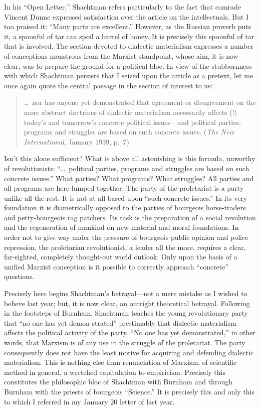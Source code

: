 In his ``Open Letter,'' Shachtman refers particularly to the fact that comrade Vincent Dunne expressed satisfaction over the article on the intellectuals. But I too praised it: “Many parts are excellent.” However, as the Russian proverb puts it, a spoonful of tar can spoil a barrel of honey. It is precisely this spoonful of tar that is involved. The section devoted to dialectic materialism expresses a number of conceptions monstrous from the Marxist standpoint, whose aim, it is now clear, was to prepare the ground for a political bloc. In view of the stubbornness with which Shachtman persists that I seized upon the article as a pretext, let me once again quote the central passage in the section of interest to us:
\begin{quote}
  \dots\ nor has anyone yet demonstrated that agreement or disagreement on the more abstract doctrines of dialectic materialism necessarily affects (!) today’s and tomorrow’s concrete political issues---and political parties, programs and struggles are based on such concrete issues. (\emph{The New International}, January 1939, p.~7)
\end{quote}
Isn’t this alone sufficient? What is above all astonishing is this formula, unworthy of revolutionists: “\dots\ political parties, programs and struggles are based on such concrete issues.” What parties? What programs? What struggles? All parties and all programs are here lumped together. The party of the proletariat is a party unlike all the rest. It is not at all based upon “such concrete issues.” In its very foundation it is diametrically opposed to the parties of bourgeois horse-traders and petty-bourgeois rag patchers. Its task is the preparation of a social revolution and the regeneration of mankind on new material and moral foundations. In order not to give way under the pressure of bourgeois public opinion and police repression, the proletarian revolutionist, a leader all the more, requires a clear, far-sighted, completely thought-out world outlook. Only upon the basis of a unified Marxist conception is it possible to correctly approach “concrete” questions.

Precisely here begins Shachtman’s betrayal---not a mere mistake as I wished to believe last year; but, it is now clear, an outright theoretical betrayal. Following in the footsteps of Burnham, Shachtman teaches the young revolutionary party that “no one has yet demon strated” prestimably that dialectic materialism affects the political activity of the party. “No one has yet demonstrated,” in other words, that Marxism is of any use in the struggle of the proletariat. The party consequently does not have the least motive for acquiring and defending dialectic materialism. This is nothing else than renunciation of Marxism, of scientific method in general, a wretched capitulation to empiricism. Precisely this constitutes the philosophic bloc of Shachtman with Burnham and through Burnham with the priests of bourgeois “Science.” It is precisely this and only this to which I referred in my January 20 letter of last year.

